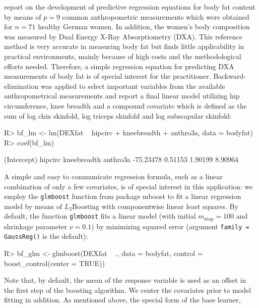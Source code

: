 \documentclass{article}
\newcommand{\Rpackage}[1]{{\normalfont\fontseries{b}\selectfont #1}}
\newcommand{\Rcmd}[1]{\texttt{#1}}
\newenvironment{Schunk}{}{}
\begin{document}
\citet{garcia2005} report on the development of predictive regression equations
for body fat content by means of $p = 9$ common anthropometric
measurements which were obtained for $n = 71$ healthy German women. 
In addition, the women's body composition was measured by 
Dual Energy X-Ray Absorptiometry (DXA). This reference method 
is very accurate in measuring body fat but finds little applicability
in practical environments, mainly because of high costs and the 
methodological efforts needed. Therefore, a simple regression equation 
for predicting DXA measurements of body fat is of special interest for the practitioner. 
Backward-elimination was applied to select
important variables from the available anthropometrical measurements and
\citet{garcia2005} report a final linear model utilizing
hip circumference, knee breadth and a compound covariate which is defined as
the sum of log chin skinfold, log triceps skinfold and log subscapular skinfold:
\begin{Schunk}
\begin{Sinput}
R> bf_lm <- lm(DEXfat ~ hipcirc + kneebreadth + anthro3a, 
         data = bodyfat)
R> coef(bf_lm)
\end{Sinput}
\begin{Soutput}
(Intercept)     hipcirc kneebreadth    anthro3a 
  -75.23478     0.51153     1.90199     8.90964 
\end{Soutput}
\end{Schunk}
A simple and easy to communicate regression formula, such as a 
linear combination of only a few covariates, is of special interest in this 
application: we employ the \Rcmd{glmboost} function from package 
\Rpackage{mboost}
to fit a linear regression model by means of $L_2$Boosting with componentwise
linear least squares. By default, the function \Rcmd{glmboost} fits a linear model (with 
initial $m_\text{stop} = 100$ and shrinkage parameter $\nu = 0.1$) by
minimizing squared error (argument \Rcmd{family = GaussReg()} is 
the default): 
\begin{Schunk}
\begin{Sinput}
R> bf_glm <- glmboost(DEXfat ~ ., data = bodyfat, 
         control = boost_control(center = TRUE))
\end{Sinput}
\end{Schunk}
Note that, by default, the mean of the response variable is used as an
offset in the first step of the boosting algorithm. We center the covariates
prior to model fitting in addition.
As mentioned above, the special form of the base learner,
\end{document}
